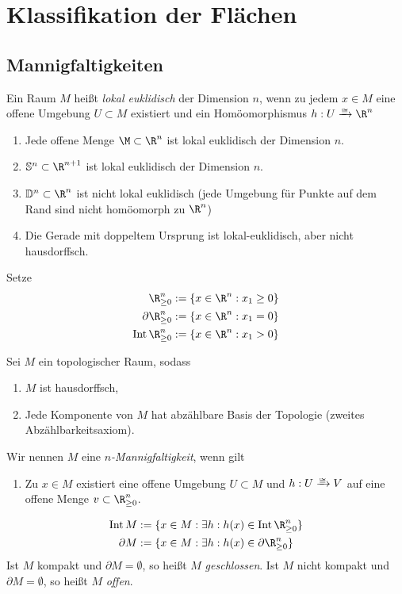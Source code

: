 \chapter{Klassifikation der Flächen}



\section{Mannigfaltigkeiten}


\begin{df}
	Ein Raum $M$ heißt \emph{lokal euklidisch} der Dimension $n$, wenn zu jedem $x \in M$ eine offene Umgebung $U \subset M$ existiert und ein Homöomorphismus $h: U \homeomorphicto \R^n$
\end{df}

\begin{ex}
	\begin{enumerate}[1)]
		\item
			Jede offene Menge $\M \subset \R^n$ ist lokal euklidisch der Dimension $n$.
		\item
			$\S^n \subset \R^{n+1}$ ist lokal euklidisch der Dimension $n$.
		\item
			$\D^n \subset \R^n$ ist nicht lokal euklidisch (jede Umgebung für Punkte auf dem Rand sind nicht homöomorph zu $\R^n$)
		\item
			Die Gerade mit doppeltem Ursprung ist lokal-euklidisch, aber nicht hausdorffsch.
	\end{enumerate}
\end{ex}

Setze
\begin{align*}
	\R_{\ge 0}^n &:= \{ x \in \R^n : x_1 \ge 0 \} \\
	\boundary \R_{\ge 0}^n &:= \{ x \in \R^n : x_1 = 0 \} \\
	\Int \R_{\ge 0}^n &:= \{ x \in \R^n : x_1 > 0 \}
\end{align*}

\begin{df}
	Sei $M$ ein topologischer Raum, sodass
	\begin{enumerate}[1)]
		\item
			$M$ ist hausdorffsch,
		\item
			Jede Komponente von $M$ hat abzählbare Basis der Topologie (zweites Abzählbarkeitsaxiom).
	\end{enumerate}
	Wir nennen $M$ eine \emph{$n$-Mannigfaltigkeit}, wenn gilt
	\begin{enumerate}[1),resume]
		\item
			Zu $x \in M$ existiert eine offene Umgebung $U \subset M$ und $h: U \homeomorphicto V$ auf eine offene Menge $v \subset \R_{\ge 0}^n$.
	\end{enumerate}
	\begin{align*}
		\Int M &:= \{ x \in M : \exists h: h(x) \in \Int \R_{\ge 0}^n \} \\
		\boundary M &:= \{ x \in M : \exists h: h(x) \in \boundary \R_{\ge 0}^n \}
	\end{align*}
	Ist $M$ kompakt und $\partial M = \emptyset$, so heißt $M$ \emph{geschlossen}.
	Ist $M$ nicht kompakt und $\partial M = \emptyset$, so heißt $M$ \emph{offen}.
\end{df}

